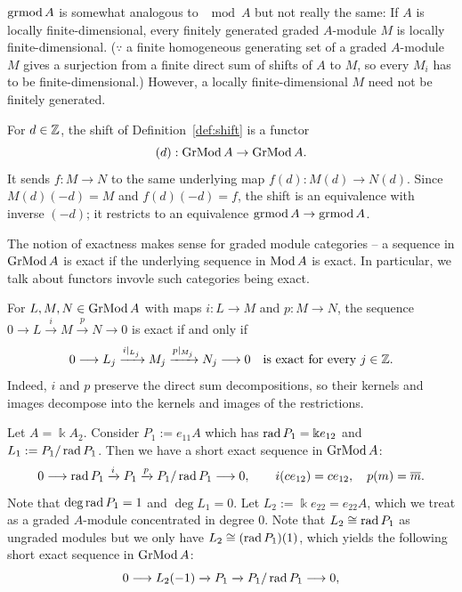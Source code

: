 \begin{remark}
$\operatorname{\mathrm{grmod}} A$ is somewhat analogous to $\mod A$ but not really the same:
If $A$ is locally finite-dimensional, every finitely generated graded $A$-module $M$ is locally finite-dimensional. ($\because$ a finite homogeneous generating set of a graded $A$-module $M$ gives a surjection from a finite direct sum of shifts of $A$ to $M$, so every $M_i$ has to be finite-dimensional.)  However, a locally finite-dimensional $M$ need not be finitely generated.
\end{remark}
 
For $d\in\mathbb{Z}$, the shift of Definition~\ref{def:shift} is a functor \[(d):\operatorname{\mathrm{GrMod}} A\to\operatorname{\mathrm{GrMod}} A.\]
It sends $f:M\to N$ to the same underlying map $f(d):M(d)\to N(d)$.
Since $M(d)(-d)=M$ and $f(d)(-d)=f$, the shift is an equivalence with inverse $(-d)$; it restricts to an equivalence $\operatorname{\mathrm{grmod}} A\to\operatorname{\mathrm{grmod}} A$.

\begin{remark}\label{rem:graded-exactness}
The notion of exactness makes sense for graded module categories -- a sequence in $\operatorname{\mathrm{GrMod}} A$ is exact if the underlying sequence in $\operatorname{\mathrm{Mod}} A$ is exact.
In particular, we talk about functors invovle such categories being exact.
\begin{supplementary}
For $L,M,N\in\operatorname{\mathrm{GrMod}} A$ with maps $i:L\to M$ and $p:M\to N$, the sequence $0\to L\xrightarrow{i}M\xrightarrow{p}N\to0$ is exact if and only if
\[
0\longrightarrow L_j\xrightarrow{i|_{L_j}}M_j\xrightarrow{p|_{M_j}}N_j\longrightarrow0
\quad\text{is exact for every }j\in\mathbb{Z}.
\]
Indeed, $i$ and $p$ preserve the direct sum decompositions, so their kernels and images decompose into the kernels and images of the restrictions.
\end{supplementary}
\end{remark}

\begin{example}\label{ex:short-exact-row}
Let $A=\Bbbk A_2$. 
Consider $P_1:=e_{11}A$ which has $\operatorname{rad}\nolimits P_1 = \Bbbk e_{12}$ and $L_1:=P_1/\operatorname{rad}\nolimits P_1$.
Then we have a short exact sequence in $\operatorname{\mathrm{GrMod}} A$:
\[
0\longrightarrow \operatorname{rad}\nolimits P_1\xrightarrow{i} P_1
\xrightarrow{p}P_1/\operatorname{rad}\nolimits P_1\longrightarrow0,
\qquad
i(c e_{12})=c e_{12},\quad p(m)=\overline m.
\]
Note that $\deg \operatorname{rad}\nolimits P_1 = 1$ and $\deg L_1=0$.  Let $L_2:=\Bbbk e_{22} = e_{22} A$, which we treat as a graded $A$-module concentrated in degree $0$.  Note that $L_2 \cong \operatorname{rad}\nolimits P_1$ as ungraded modules but we only have $L_2\cong (\operatorname{rad}\nolimits P_1) (1)$, which yields the following short exact sequence in $\operatorname{\mathrm{GrMod}} A$:
\[
0\longrightarrow L_2(-1)\xrightarrow{} P_1
\xrightarrow{}P_1/\operatorname{rad}\nolimits P_1\longrightarrow0,
\]
\end{example}


